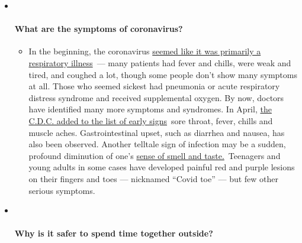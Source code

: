 \begin{itemize}
\item ~
  \hypertarget{what-are-the-symptoms-of-coronavirus}{%
  \paragraph{What are the symptoms of
  coronavirus?}\label{what-are-the-symptoms-of-coronavirus}}

  \begin{itemize}
  \tightlist
  \item
    In the beginning, the coronavirus
    \href{https://www.nytimes3xbfgragh.onion/article/coronavirus-facts-history.html?action=click\&pgtype=Article\&state=default\&region=MAIN_CONTENT_3\&context=storylines_faq\#link-6817bab5}{seemed
    like it was primarily a respiratory illness}~--- many patients had
    fever and chills, were weak and tired, and coughed a lot, though
    some people don't show many symptoms at all. Those who seemed
    sickest had pneumonia or acute respiratory distress syndrome and
    received supplemental oxygen. By now, doctors have identified many
    more symptoms and syndromes. In April,
    \href{https://www.nytimes3xbfgragh.onion/2020/04/27/health/coronavirus-symptoms-cdc.html?action=click\&pgtype=Article\&state=default\&region=MAIN_CONTENT_3\&context=storylines_faq}{the
    C.D.C. added to the list of early signs}~sore throat, fever, chills
    and muscle aches. Gastrointestinal upset, such as diarrhea and
    nausea, has also been observed. Another telltale sign of infection
    may be a sudden, profound diminution of one's
    \href{https://www.nytimes3xbfgragh.onion/2020/03/22/health/coronavirus-symptoms-smell-taste.html?action=click\&pgtype=Article\&state=default\&region=MAIN_CONTENT_3\&context=storylines_faq}{sense
    of smell and taste.}~Teenagers and young adults in some cases have
    developed painful red and purple lesions on their fingers and toes
    --- nicknamed ``Covid toe'' --- but few other serious symptoms.
  \end{itemize}
\item ~
  \hypertarget{why-is-it-safer-to-spend-time-together-outside}{%
  \paragraph{Why is it safer to spend time together
  outside?}\label{why-is-it-safer-to-spend-time-together-outside}}


\end{itemize}

